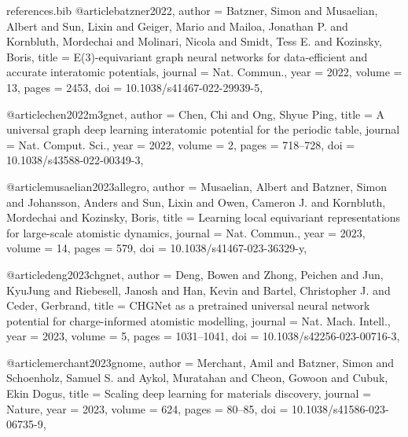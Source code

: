 \begin{filecontents*}[overwrite]{references.bib}
@article{batzner2022,
  author = {Batzner, Simon and Musaelian, Albert and Sun, Lixin and Geiger, Mario and Mailoa, Jonathan P. and Kornbluth, Mordechai and Molinari, Nicola and Smidt, Tess E. and Kozinsky, Boris},
  title = {E(3)-equivariant graph neural networks for data-efficient and accurate interatomic potentials},
  journal = {Nat. Commun.},
  year = {2022},
  volume = {13},
  pages = {2453},
  doi = {10.1038/s41467-022-29939-5},
}

@article{chen2022m3gnet,
  author = {Chen, Chi and Ong, Shyue Ping},
  title = {A universal graph deep learning interatomic potential for the periodic table},
  journal = {Nat. Comput. Sci.},
  year = {2022},
  volume = {2},
  pages = {718--728},
  doi = {10.1038/s43588-022-00349-3},
}

@article{musaelian2023allegro,
  author = {Musaelian, Albert and Batzner, Simon and Johansson, Anders and Sun, Lixin and Owen, Cameron J. and Kornbluth, Mordechai and Kozinsky, Boris},
  title = {Learning local equivariant representations for large-scale atomistic dynamics},
  journal = {Nat. Commun.},
  year = {2023},
  volume = {14},
  pages = {579},
  doi = {10.1038/s41467-023-36329-y},
}

@article{deng2023chgnet,
  author = {Deng, Bowen and Zhong, Peichen and Jun, KyuJung and Riebesell, Janosh and Han, Kevin and Bartel, Christopher J. and Ceder, Gerbrand},
  title = {CHGNet as a pretrained universal neural network potential for charge-informed atomistic modelling},
  journal = {Nat. Mach. Intell.},
  year = {2023},
  volume = {5},
  pages = {1031--1041},
  doi = {10.1038/s42256-023-00716-3},
}

@article{merchant2023gnome,
  author = {Merchant, Amil and Batzner, Simon and Schoenholz, Samuel S. and Aykol, Muratahan and Cheon, Gowoon and Cubuk, Ekin Dogus},
  title = {Scaling deep learning for materials discovery},
  journal = {Nature},
  year = {2023},
  volume = {624},
  pages = {80--85},
  doi = {10.1038/s41586-023-06735-9},
}


\end{filecontents*}
